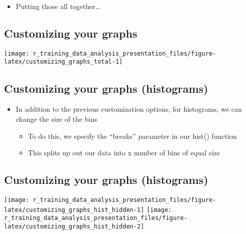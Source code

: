 \documentclass[]{article}
\newenvironment{Shaded}{\begin{snugshade}}{\end{snugshade}}
\newcommand{\KeywordTok}[1]{\textcolor[rgb]{0.13,0.29,0.53}{\textbf{#1}}}
\newcommand{\DataTypeTok}[1]{\textcolor[rgb]{0.13,0.29,0.53}{#1}}
\newcommand{\DecValTok}[1]{\textcolor[rgb]{0.00,0.00,0.81}{#1}}
\newcommand{\OperatorTok}[1]{\textcolor[rgb]{0.81,0.36,0.00}{\textbf{#1}}}
\newcommand{\NormalTok}[1]{#1}
\providecommand{\tightlist}{%
  \setlength{\itemsep}{0pt}\setlength{\parskip}{0pt}}
\begin{document}
\begin{itemize}
\tightlist
\item
  Putting those all together\ldots{}
\end{itemize}

\subsection{Customizing your graphs}\label{customizing-your-graphs-3}

\begin{center}\texttt{[image: r\_training\_data\_analysis\_presentation\_files/figure-latex/customizing\_graphs\_total-1]} \end{center}

\subsection{Customizing your graphs
(histograms)}\label{customizing-your-graphs-histograms}

\begin{itemize}
\tightlist
\item
  In addition to the previous customization options, for histograms, we
  can change the size of the bins

  \begin{itemize}
  \tightlist
  \item
    To do this, we specify the ``breaks'' parameter in our hist()
    function
  \item
    This splits up out our data into x number of bins of equal size
  \end{itemize}
\end{itemize}

\begin{Shaded}
\end{Shaded}

\subsection{Customizing your graphs
(histograms)}\label{customizing-your-graphs-histograms-1}

\texttt{[image: r\_training\_data\_analysis\_presentation\_files/figure-latex/customizing\_graphs\_hist\_hidden-1]}
\texttt{[image: r\_training\_data\_analysis\_presentation\_files/figure-latex/customizing\_graphs\_hist\_hidden-2]}
\end{document}
